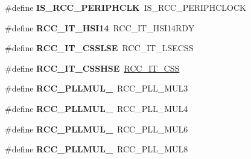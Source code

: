 \begin{DoxyCompactItemize}
\item 
\mbox{\label{group___h_a_l___r_c_c___aliased_gad38e6304f89528092a9a24943b955d03}} 
\#define {\bfseries I\+S\+\_\+\+R\+C\+C\+\_\+\+P\+E\+R\+I\+P\+H\+C\+LK}~I\+S\+\_\+\+R\+C\+C\+\_\+\+P\+E\+R\+I\+P\+H\+C\+L\+O\+CK
\item 
\mbox{\label{group___h_a_l___r_c_c___aliased_ga1d2b2eb3fca0475683b879377c952fbf}} 
\#define {\bfseries R\+C\+C\+\_\+\+I\+T\+\_\+\+H\+S\+I14}~R\+C\+C\+\_\+\+I\+T\+\_\+\+H\+S\+I14\+R\+DY
\item 
\mbox{\label{group___h_a_l___r_c_c___aliased_ga2693825b3d6ae5e2202c59e9ff0f84e9}} 
\#define {\bfseries R\+C\+C\+\_\+\+I\+T\+\_\+\+C\+S\+S\+L\+SE}~R\+C\+C\+\_\+\+I\+T\+\_\+\+L\+S\+E\+C\+SS
\item 
\mbox{\label{group___h_a_l___r_c_c___aliased_ga0f173b0e032747b82a9322739f6e3635}} 
\#define {\bfseries R\+C\+C\+\_\+\+I\+T\+\_\+\+C\+S\+S\+H\+SE}~\hyperlink{group___r_c_c___interrupt_ga9bb34a4912d2084dc1c0834eb53aa7a3}{R\+C\+C\+\_\+\+I\+T\+\_\+\+C\+SS}
\item 
\mbox{\label{group___h_a_l___r_c_c___aliased_ga7ff52ba9f89830affd1e02929b4db74e}} 
\#define {\bfseries R\+C\+C\+\_\+\+P\+L\+L\+M\+U\+L\+\_}~R\+C\+C\+\_\+\+P\+L\+L\+\_\+\+M\+U\+L3
\item 
\mbox{\label{group___h_a_l___r_c_c___aliased_ga48cf05c73391e2319b0be6b2a3c9d9c9}} 
\#define {\bfseries R\+C\+C\+\_\+\+P\+L\+L\+M\+U\+L\+\_}~R\+C\+C\+\_\+\+P\+L\+L\+\_\+\+M\+U\+L4
\item 
\mbox{\label{group___h_a_l___r_c_c___aliased_gacbc14a066a66d57867c5f1f5a3669201}} 
\#define {\bfseries R\+C\+C\+\_\+\+P\+L\+L\+M\+U\+L\+\_}~R\+C\+C\+\_\+\+P\+L\+L\+\_\+\+M\+U\+L6
\item 
\mbox{\label{group___h_a_l___r_c_c___aliased_gaa2dc44220ad0fa4e951fa2bd64b3b154}} 
\#define {\bfseries R\+C\+C\+\_\+\+P\+L\+L\+M\+U\+L\+\_}~R\+C\+C\+\_\+\+P\+L\+L\+\_\+\+M\+U\+L8
\item 

\end{DoxyCompactItemize}
